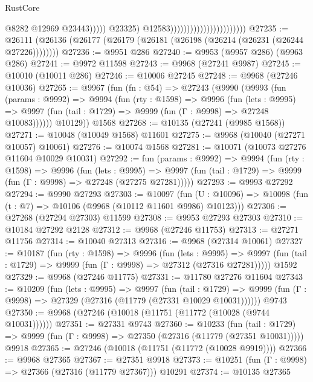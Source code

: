 \begin{lexlean}{RustCore}
\begin{coremodule}
                                                              @8282
                                                              @12969
                                                              @23443)))))
                                                    @23325)
                                                  @12583)))))))))))))))))))))))
@27235 := @26111 (@26136 (@26177 (@26179 (@26181 (@26198 (@26214 (@26231 (@26244 @27226))))))))
@27236 := @9951 @286
@27240 := @9953 (@9957 @286) (@9963 @286)
@27241 := @9972 @11598
@27243 := @9968 (@27241 @9987)
@27245 := @10010 (@10011 @286)
@27246 := @10006 @27245
@27248 := @9968 (@27246 @10036)
@27265 := @9967
    (fun (fn : @54) =>
    @27243
      (@9990
        (@9993
          (fun (params : @9992) =>
          @9994
            (fun (rty : @1598) =>
            @9996
              (fun (lets : @9995) =>
              @9997 (fun (tail : @1729) => @9999 (fun (Γ : @9998) => @27248 @10083))))))
        @10129))
    @1568
@27268 := @10135 (@27241 (@9985 @1568))
@27271 := @10048 (@10049 @1568) @11601
@27275 := @9968 (@10040 (@27271 @10057) @10061)
@27276 := @10074 @1568
@27281 := @10071 (@10073 @27276 @11604 @10029 @10031)
@27292 := fun (params : @9992) =>
  @9994
    (fun (rty : @1598) =>
    @9996
      (fun (lets : @9995) =>
      @9997 (fun (tail : @1729) => @9999 (fun (Γ : @9998) => @27248 (@27275 @27281)))))
@27293 := @9993 @27292
@27294 := @9990 @27293
@27303 := @10097
    (fun (U : @10096) => @10098 (fun (t : @7) => @10106 (@9968 (@10112 @11601 @9986) @10123)))
@27306 := @27268 (@27294 @27303) @11599
@27308 := @9953 @27293 @27303
@27310 := @10184 @27292 @2128
@27312 := @9968 (@27246 @11753)
@27313 := @27271 @11756
@27314 := @10040 @27313
@27316 := @9968 (@27314 @10061)
@27327 := @10187
    (fun (rty : @1598) =>
    @9996
      (fun (lets : @9995) =>
      @9997 (fun (tail : @1729) => @9999 (fun (Γ : @9998) => @27312 (@27316 @27281)))))
    @1592
@27329 := @9968 (@27246 @11775)
@27331 := @11780 @27276 @11604
@27343 := @10209
    (fun (lets : @9995) =>
    @9997
      (fun (tail : @1729) =>
      @9999 (fun (Γ : @9998) => @27329 (@27316 (@11779 (@27331 @10029 @10031))))))
    @9743
@27350 := @9968 (@27246 (@10018 (@11751 (@11772 (@10028 (@9744 @10031))))))
@27351 := @27331 @9743
@27360 := @10233
    (fun (tail : @1729) => @9999 (fun (Γ : @9998) => @27350 (@27316 (@11779 (@27351 @10031)))))
    @9918
@27365 := @27246 (@10018 (@11751 (@11772 (@10028 @9919))))
@27366 := @9968 @27365
@27367 := @27351 @9918
@27373 := @10251 (fun (Γ : @9998) => @27366 (@27316 (@11779 @27367))) @10291
@27374 := @10135 @27365

\end{coremodule}
\end{lexlean}
